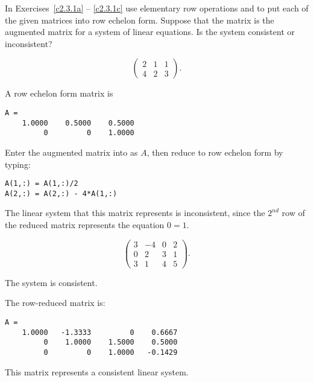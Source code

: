 \documentclass{ximera}
\begin{document}
\noindent In Exercises~\ref{c2.3.1a} -- \ref{c2.3.1c} use elementary row
operations and \Matlab to put each of the given matrices into row echelon
form.  Suppose that the matrix is the augmented matrix for a system of
linear equations.  Is the system consistent or inconsistent?

\begin{computerExercise} \label{c2.3.1a}
\[
\left(\begin{array}{rrr}
 2 &  1  &  1   \\
 4 &  2  &  3
\end{array}\right).
\]

\begin{solution}
\ans A row echelon form matrix is
\begin{verbatim}
A = 
    1.0000    0.5000    0.5000
         0         0    1.0000
\end{verbatim}
\soln Enter the augmented matrix into \Matlab as $A$, then reduce to
row echelon form by typing:
\begin{verbatim}
A(1,:) = A(1,:)/2
A(2,:) = A(2,:) - 4*A(1,:)
\end{verbatim}
The linear system that this matrix represents is inconsistent, since
the $2^{nd}$ row of the reduced matrix represents the equation $0 = 1$.

\end{solution}
\end{computerExercise}
\begin{computerExercise} \label{c2.3.1b}
\[
\left(\begin{array}{rrrr}
 3  & -4 & 0 & 2\\
 0  &  2 & 3 & 1\\
 3  &  1 & 4 & 5
\end{array}\right).
\]

\begin{solution}
\ans The system is consistent.

\soln The row-reduced matrix is:
\begin{verbatim}
A =
    1.0000   -1.3333         0    0.6667
         0    1.0000    1.5000    0.5000
         0         0    1.0000   -0.1429
\end{verbatim}
This matrix represents a consistent linear system.

\end{solution}
\end{computerExercise}
\end{document}

